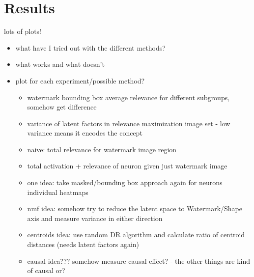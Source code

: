 \section{Results}
lots of plots!
\begin{itemize}
    \item what have I tried out with the different methods?
    \item what works and what doesn't
    \item plot for each experiment/possible method?
          \begin{itemize}
              \item watermark bounding box average relevance for different subgroups, somehow get difference
              \item variance of latent factors in relevance maximization image set - low variance means it encodes the concept
              \item naive: total relevance for watermark image region
              \item total activation + relevance of neuron given just watermark image
              \item one idea: take masked/bounding box approach again for neurons individual heatmaps
              \item nmf idea: somehow try to reduce the latent space to Watermark/Shape axis and measure variance in either direction
              \item centroids idea: use random DR algorithm and calculate ratio of centroid distances (needs latent factors again)
              \item causal idea??? somehow measure causal effect? - the other things are kind of causal or?
          \end{itemize}
\end{itemize}



